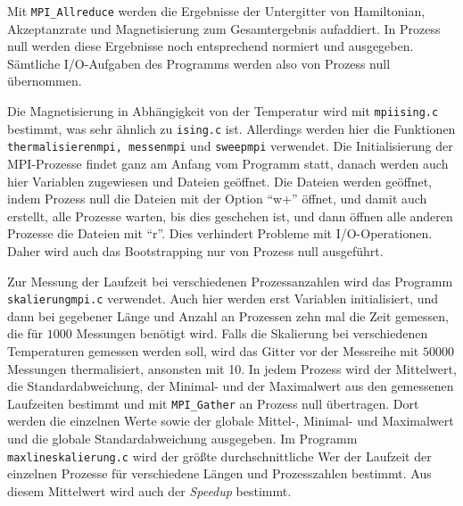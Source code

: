 	Mit \texttt{MPI\_Allreduce} werden die Ergebnisse der Untergitter von Hamiltonian, Akzeptanzrate und Magnetisierung zum Gesamtergebnis aufaddiert. In Prozess null werden diese Ergebnisse noch entsprechend normiert und ausgegeben. Sämtliche I/O-Aufgaben des Programms werden also von Prozess null übernommen.
	
	Die Magnetisierung in Abhängigkeit von der Temperatur wird mit \texttt{mpiising.c} bestimmt, was sehr ähnlich zu \texttt{ising.c} ist. Allerdings werden hier die Funktionen \texttt{thermalisierenmpi, messenmpi} und \texttt{sweepmpi} verwendet. 
	Die Initialisierung der MPI-Prozesse findet ganz am Anfang vom Programm statt, danach werden auch hier Variablen zugewiesen und Dateien geöffnet. Die Dateien werden geöffnet, indem Prozess null die Dateien mit der Option \enquote{w+} öffnet, und damit auch erstellt, alle Prozesse warten, bis dies geschehen ist, und dann öffnen alle anderen Prozesse die Dateien mit \enquote{r}. Dies verhindert Probleme mit I/O-Operationen. Daher wird auch das Bootstrapping nur von Prozess null ausgeführt.
	
	Zur Messung der Laufzeit bei verschiedenen Prozessanzahlen wird das Programm \texttt{skalierungmpi.c} verwendet. Auch hier werden erst Variablen initialisiert, und dann bei gegebener Länge und Anzahl an Prozessen zehn mal die Zeit gemessen, die für $1000$ Messungen benötigt wird. Falls die Skalierung bei verschiedenen Temperaturen gemessen werden soll, wird das Gitter vor der Messreihe mit $50000$ Messungen thermalisiert, ansonsten mit 10. In jedem Prozess wird der Mittelwert, die Standardabweichung, der Minimal- und der Maximalwert aus den gemessenen Laufzeiten bestimmt und mit \texttt{MPI\_Gather} an Prozess null übertragen. Dort werden die einzelnen Werte sowie der globale Mittel-, Minimal- und Maximalwert und die globale Standardabweichung ausgegeben. Im Programm \texttt{maxlineskalierung.c} wird der größte durchschnittliche Wer der Laufzeit der einzelnen Prozesse für verschiedene Längen und Prozesszahlen bestimmt. Aus diesem Mittelwert wird auch der \textit{Speedup} bestimmt.  
%	


	

